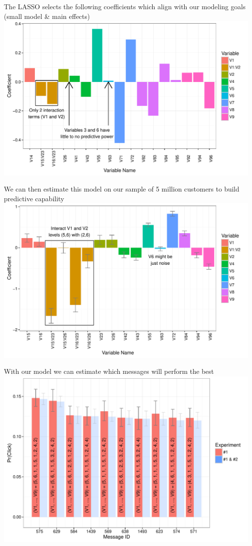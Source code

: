 \documentclass[11pt,xcolor=svgnames]{beamer}
\newcommand{\fg}{\color{ForestGreen}}
\begin{document}
\begin{frame}
The LASSO selects the following coefficients which align with our modeling goals ({\fg small model} \& {\fg main effects})
\includegraphics[width=\textwidth]{coef_all.pdf}
\end{frame}

\begin{frame}
We can then estimate this model on our sample of 5 million customers to build predictive capability
\includegraphics[width=\textwidth]{final_model_coefs.pdf}
\end{frame}

\begin{frame}
With our model we can estimate which messages will perform the best
\includegraphics[width=\textwidth]{barplot1.pdf}
\end{frame}
\end{document}

